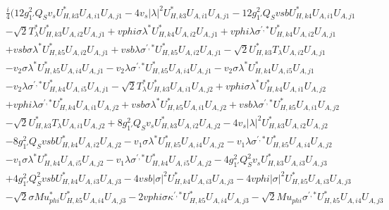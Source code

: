 \begin{align} 
 &\frac{i}{4} \Big(12 g_{1'}^{2} Q_{S} v_s U^*_{{H},{k 3}} U_{A,{i 1}} U_{A,{j 1}} -4 v_s |\lambda|^2 U^*_{{H},{k 3}} U_{A,{i 1}} U_{A,{j 1}} -12 g_{1'}^{2} Q_{S} vsb U^*_{{H},{k 4}} U_{A,{i 1}} U_{A,{j 1}} \nonumber \\ 
 &- \sqrt{2} T_{\lambda}^* U^*_{{H},{k 3}} U_{A,{i 2}} U_{A,{j 1}} +vphi \sigma \lambda^* U^*_{{H},{k 4}} U_{A,{i 2}} U_{A,{j 1}} +vphi \lambda \sigma^{\prime,*} U^*_{{H},{k 4}} U_{A,{i 2}} U_{A,{j 1}} \nonumber \\ 
 &+vsb \sigma \lambda^* U^*_{{H},{k 5}} U_{A,{i 2}} U_{A,{j 1}} +vsb \lambda \sigma^{\prime,*} U^*_{{H},{k 5}} U_{A,{i 2}} U_{A,{j 1}} - \sqrt{2} U^*_{{H},{k 3}} T_{\lambda} U_{A,{i 2}} U_{A,{j 1}} \nonumber \\ 
 &- v_2 \sigma \lambda^* U^*_{{H},{k 5}} U_{A,{i 4}} U_{A,{j 1}} - v_2 \lambda \sigma^{\prime,*} U^*_{{H},{k 5}} U_{A,{i 4}} U_{A,{j 1}} - v_2 \sigma \lambda^* U^*_{{H},{k 4}} U_{A,{i 5}} U_{A,{j 1}} \nonumber \\ 
 &- v_2 \lambda \sigma^{\prime,*} U^*_{{H},{k 4}} U_{A,{i 5}} U_{A,{j 1}} - \sqrt{2} T_{\lambda}^* U^*_{{H},{k 3}} U_{A,{i 1}} U_{A,{j 2}} +vphi \sigma \lambda^* U^*_{{H},{k 4}} U_{A,{i 1}} U_{A,{j 2}} \nonumber \\ 
 &+vphi \lambda \sigma^{\prime,*} U^*_{{H},{k 4}} U_{A,{i 1}} U_{A,{j 2}} +vsb \sigma \lambda^* U^*_{{H},{k 5}} U_{A,{i 1}} U_{A,{j 2}} +vsb \lambda \sigma^{\prime,*} U^*_{{H},{k 5}} U_{A,{i 1}} U_{A,{j 2}} \nonumber \\ 
 &- \sqrt{2} U^*_{{H},{k 3}} T_{\lambda} U_{A,{i 1}} U_{A,{j 2}} +8 g_{1'}^{2} Q_{S} v_s U^*_{{H},{k 3}} U_{A,{i 2}} U_{A,{j 2}} -4 v_s |\lambda|^2 U^*_{{H},{k 3}} U_{A,{i 2}} U_{A,{j 2}} \nonumber \\ 
 &-8 g_{1'}^{2} Q_{S} vsb U^*_{{H},{k 4}} U_{A,{i 2}} U_{A,{j 2}} - v_1 \sigma \lambda^* U^*_{{H},{k 5}} U_{A,{i 4}} U_{A,{j 2}} - v_1 \lambda \sigma^{\prime,*} U^*_{{H},{k 5}} U_{A,{i 4}} U_{A,{j 2}} \nonumber \\ 
 &- v_1 \sigma \lambda^* U^*_{{H},{k 4}} U_{A,{i 5}} U_{A,{j 2}} - v_1 \lambda \sigma^{\prime,*} U^*_{{H},{k 4}} U_{A,{i 5}} U_{A,{j 2}} -4 g_{1'}^{2} Q_{S}^{2} v_s U^*_{{H},{k 3}} U_{A,{i 3}} U_{A,{j 3}} \nonumber \\ 
 &+4 g_{1'}^{2} Q_{S}^{2} vsb U^*_{{H},{k 4}} U_{A,{i 3}} U_{A,{j 3}} -4 vsb |\sigma|^2 U^*_{{H},{k 4}} U_{A,{i 3}} U_{A,{j 3}} -4 vphi |\sigma|^2 U^*_{{H},{k 5}} U_{A,{i 3}} U_{A,{j 3}} \nonumber \\ 
 &- \sqrt{2} \sigma Mu_{phi}^* U^*_{{H},{k 5}} U_{A,{i 4}} U_{A,{j 3}} -2 vphi \sigma \kappa^{\prime,*} U^*_{{H},{k 5}} U_{A,{i 4}} U_{A,{j 3}} - \sqrt{2} Mu_{phi} \sigma^{\prime,*} U^*_{{H},{k 5}} U_{A,{i 4}} U_{A,{j 3}} \nonumber \\ 

\end{align}
